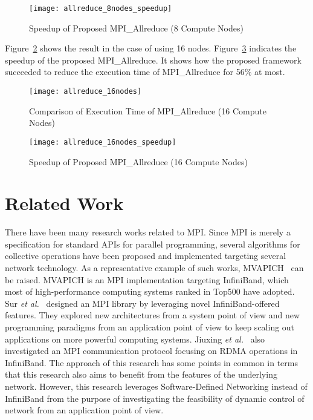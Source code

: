 \begin{figure}
    \centering
    \texttt{[image: allreduce\_8nodes\_speedup]}
    \caption{Speedup of Proposed MPI\_Allreduce (8 Compute Nodes)}%
    \label{fig:evaluation-8nodes-normalized}
\end{figure}

Figure~\ref{fig:evaluation-16nodes} shows the result in the case of using 16
nodes. Figure~\ref{fig:evaluation-16nodes-normalized} indicates the speedup of
the proposed MPI\_Allreduce. It shows how the proposed framework succeeded
to reduce the execution time of MPI\_Allreduce for 56\% at most.

\begin{figure}
    \centering
    \texttt{[image: allreduce\_16nodes]}
    \caption{Comparison of Execution Time of MPI\_Allreduce (16 Compute Nodes)}%
    \label{fig:evaluation-16nodes}
\end{figure}

\begin{figure}
    \centering
    \texttt{[image: allreduce\_16nodes\_speedup]}
    \caption{Speedup of Proposed MPI\_Allreduce (16 Compute Nodes)}%
    \label{fig:evaluation-16nodes-normalized}
\end{figure}

\section{Related Work}\label{sec:iii-related-work}

There have been many research works related to MPI\@. Since MPI is merely a
specification for standard APIs for parallel programming, several algorithms
for collective operations have been proposed and implemented targeting several
network technology. As a representative example of such works,
MVAPICH~\autocite{mvapich} can be raised. MVAPICH is an MPI implementation
targeting InfiniBand, which most of high-performance computing systems ranked
in Top500 have adopted. Sur \emph{et al.}~\autocite{Sur2011} designed an MPI
library by leveraging novel InfiniBand-offered features. They explored new
architectures from a system point of view and new programming paradigms from
an application point of view to keep scaling out applications on more powerful
computing systems. Jiuxing \emph{et al.}~\autocite{Jiuxing2004} also
investigated an MPI communication protocol focusing on RDMA operations in
InfiniBand. The approach of this research has some points in common in terms
that this research also aims to benefit from the features of the underlying
network. However, this research leverages Software-Defined Networking instead
of InfiniBand from the purpose of investigating the feasibility of dynamic
control of network from an application point of view.

